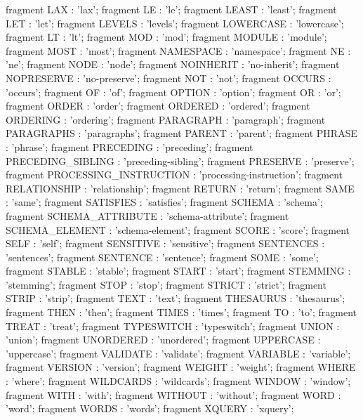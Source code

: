 fragment LAX           : 'lax';
fragment LE           : 'le';
fragment LEAST           : 'least';
fragment LET           : 'let';
fragment LEVELS         : 'levels';
fragment LOWERCASE         : 'lowercase';
fragment LT           : 'lt';
fragment MOD           : 'mod';
fragment MODULE         : 'module';
fragment MOST           : 'most';
fragment NAMESPACE         : 'namespace';
fragment NE           : 'ne';
fragment NODE           : 'node';
fragment NOINHERIT         : 'no-inherit';
fragment NOPRESERVE       : 'no-preserve';
fragment NOT           : 'not';
fragment OCCURS         : 'occurs';
fragment OF           : 'of';
fragment OPTION         : 'option';
fragment OR           : 'or';
fragment ORDER           : 'order';
fragment ORDERED         : 'ordered';
fragment ORDERING         : 'ordering';
fragment PARAGRAPH         : 'paragraph';
fragment PARAGRAPHS       : 'paragraphs';
fragment PARENT         : 'parent';
fragment PHRASE         : 'phrase';
fragment PRECEDING         : 'preceding';
fragment PRECEDING_SIBLING     : 'preceding-sibling';
fragment PRESERVE         : 'preserve';
fragment PROCESSING_INSTRUCTION  : 'processing-instruction';
fragment RELATIONSHIP       : 'relationship';
fragment RETURN         : 'return';
fragment SAME           : 'same';
fragment SATISFIES         : 'satisfies';
fragment SCHEMA         : 'schema';
fragment SCHEMA_ATTRIBUTE     : 'schema-attribute';
fragment SCHEMA_ELEMENT       : 'schema-element';
fragment SCORE           : 'score';
fragment SELF           : 'self';
fragment SENSITIVE         : 'sensitive';
fragment SENTENCES         : 'sentences';
fragment SENTENCE         : 'sentence';
fragment SOME           : 'some';
fragment STABLE         : 'stable';
fragment START           : 'start';
fragment STEMMING         : 'stemming';
fragment STOP           : 'stop';
fragment STRICT         : 'strict';
fragment STRIP           : 'strip';
fragment TEXT           : 'text';
fragment THESAURUS         : 'thesaurus';
fragment THEN           : 'then';
fragment TIMES           : 'times';
fragment TO           : 'to';
fragment TREAT           : 'treat';
fragment TYPESWITCH       : 'typeswitch';
fragment UNION           : 'union';
fragment UNORDERED         : 'unordered';
fragment UPPERCASE         : 'uppercase';
fragment VALIDATE         : 'validate';
fragment VARIABLE         : 'variable';
fragment VERSION         : 'version';
fragment WEIGHT         : 'weight';
fragment WHERE           : 'where';
fragment WILDCARDS         : 'wildcards';
fragment WINDOW         : 'window';
fragment WITH           : 'with';
fragment WITHOUT         : 'without';
fragment WORD           : 'word';
fragment WORDS           : 'words';
fragment XQUERY          : 'xquery';



